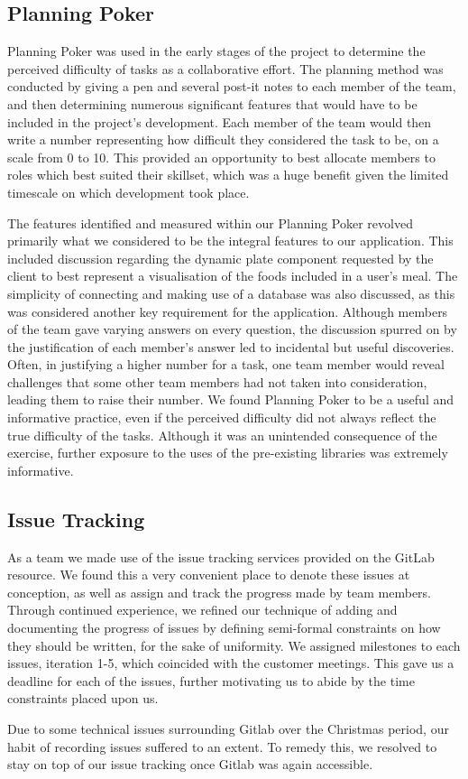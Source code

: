 \documentclass{l3proj}
\begin{document}
\subsection{Planning Poker}
\label{subsec:planning poker}
Planning Poker was used in the early stages of the project to determine the perceived difficulty of tasks as a collaborative effort. The planning method was conducted by giving a pen and several post-it notes to each member of the team, and then determining numerous significant features that would have to be included in the project's development. Each member of the team would then write a number representing how difficult they considered the task to be, on a scale from 0 to 10. This provided an opportunity to best allocate members to roles which best suited their skillset, which was a huge benefit given the limited timescale on which development took place. \par
The features identified and measured within our Planning Poker revolved primarily what we considered to be the integral features to our application. This included discussion regarding the dynamic plate component requested by the client to best represent a visualisation of the foods included in a user's meal. The simplicity of connecting and making use of a database was also discussed, as this was considered another key requirement for the application. Although members of the team gave varying answers on every question, the discussion spurred on by the justification of each member's answer led to incidental but useful discoveries. Often, in justifying a higher number for a task, one team member would reveal challenges that some other team members had not taken into consideration, leading them to raise their number. We found Planning Poker to be a useful and informative practice, even if the perceived difficulty did not always reflect the true difficulty of the tasks. Although it was an unintended consequence of the exercise, further exposure to the uses of the pre-existing libraries was extremely informative.\par
\subsection{Issue Tracking}
\label{subsec: issue tracking}
As a team we made use of the issue tracking services provided on the GitLab resource. We found this a very convenient place to denote these issues at conception, as well as assign and track the progress made by team members. Through continued experience, we refined our technique of adding and documenting the progress of issues by defining semi-formal constraints on how they should be written, for the sake of uniformity. We assigned milestones to each issues, iteration 1-5, which coincided with the customer meetings. This gave us a deadline for each of the issues, further motivating us to abide by the time constraints placed upon us. \par
Due to some technical issues surrounding Gitlab over the Christmas period, our habit of recording issues suffered to an extent. To remedy this, we resolved to stay on top of our issue tracking once Gitlab was again accessible. \par 
\end{document}

